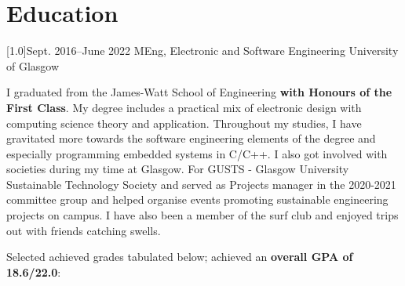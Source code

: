 \documentclass[]{cv-style}     %
\begin{document}
\hspace*{-5.5cm}\begin{minipage}[b]{1.4\textwidth}
\vspace{-0.55cm}
\section{Education}
  \vspace{0.2cm}
\begin{entrylist}
\entry
{\scalebox{.8}[1.0]{Sept. 2016--June 2022}}
{MEng, Electronic and Software Engineering}
{University of Glasgow}
{
I graduated from the James-Watt School of Engineering \textbf{with Honours of the First Class}. My degree includes a practical mix of electronic design with computing science theory and application. Throughout my studies, I have gravitated more towards the software engineering elements of the degree and especially programming embedded systems in C/C++. I also got involved with societies during my time at Glasgow. For GUSTS - Glasgow University Sustainable Technology Society and served as Projects manager in the 2020-2021 committee group and helped organise events promoting sustainable engineering projects on campus. I have also been a member of the surf club and enjoyed trips out with friends catching swells. 
\vspace{0.1cm}



Selected achieved grades tabulated below; achieved an \textbf{overall GPA of 18.6/22.0}:

\vspace{0.2cm}

}
\end{entrylist}
\end{minipage}
\end{document}
